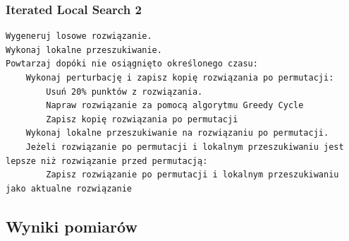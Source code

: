 \documentclass[a4paper]{article}
\begin{document}
\subsubsection{Iterated Local Search 2}

\begin{lstlisting}
Wygeneruj losowe rozwiązanie.
Wykonaj lokalne przeszukiwanie.
Powtarzaj dopóki nie osiągnięto określonego czasu:
    Wykonaj perturbację i zapisz kopię rozwiązania po permutacji:
        Usuń 20% punktów z rozwiązania.
        Napraw rozwiązanie za pomocą algorytmu Greedy Cycle
        Zapisz kopię rozwiązania po permutacji
    Wykonaj lokalne przeszukiwanie na rozwiązaniu po permutacji.
    Jeżeli rozwiązanie po permutacji i lokalnym przeszukiwaniu jest lepsze niż rozwiązanie przed permutacją:
    	Zapisz rozwiązanie po permutacji i lokalnym przeszukiwaniu jako aktualne rozwiązanie
\end{lstlisting}

\subsection{Wyniki pomiarów}
\end{document}
